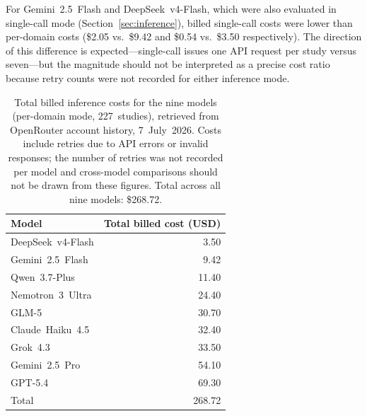 \documentclass[../main.tex]{subfiles}
\begin{document}
For Gemini~2.5~Flash and DeepSeek~v4-Flash, which were also evaluated in
single-call mode (Section~\ref{sec:inference}), billed single-call costs
were lower than per-domain costs (\$2.05 vs.\ \$9.42 and \$0.54 vs.\ \$3.50
respectively).
The direction of this difference is expected---single-call issues one API
request per study versus seven---but the magnitude should not be interpreted
as a precise cost ratio because retry counts were not recorded for either
inference mode.

\begin{table}[ht]
\centering
\caption{Total billed inference costs for the nine models (per-domain mode,
227~studies), retrieved from OpenRouter account history, 7~July~2026.
Costs include retries due to API errors or invalid responses; the number of
retries was not recorded per model and cross-model comparisons should not be
drawn from these figures.
Total across all nine models: \$268.72.}
\label{tab:cost}
\begin{tabular}{lr}
\toprule
Model & Total billed cost (USD) \\
\midrule
DeepSeek~v4-Flash    &  3.50 \\
Gemini~2.5~Flash     &  9.42 \\
Qwen~3.7-Plus        & 11.40 \\
Nemotron~3~Ultra     & 24.40 \\
GLM-5                & 30.70 \\
Claude~Haiku~4.5     & 32.40 \\
Grok~4.3             & 33.50 \\
Gemini~2.5~Pro       & 54.10 \\
GPT-5.4              & 69.30 \\
\midrule
Total                & 268.72 \\
\bottomrule
\end{tabular}
\end{table}
\end{document}
